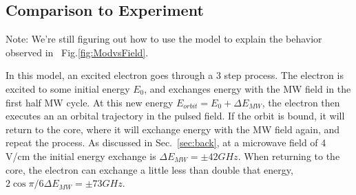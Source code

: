\documentclass[aps,pra,preprint,groupedaddress]{revtex4-1}
\begin{document}

\subsection{\label{sec:ComptoExp} Comparison to Experiment}









Note: We're still figuring out how to use the model to explain the behavior observed in ~Fig.\ref{fig:ModvsField}.

In this model, an excited electron goes through a 3 step process. The electron is excited to some initial energy $E_0$, and exchanges energy with the MW field in the first half MW cycle. At this new energy $E_{orbit} = E_0 + \Delta E_{MW}$, the electron then executes an an orbital trajectory in the pulsed field. If the orbit is bound, it will return to the core, where it will exchange energy with the MW field again, and repeat the process. As discussed in Sec.~\ref{sec:back}, at a microwave field of 4 V/cm the initial energy exchange is $\Delta E_{MW} = \pm 42 GHz$. When returning to the core, the electron can exchange a little less than double that energy, $2 \cos{\pi/6} \Delta E_{MW} = \pm 73 GHz$.
\end{document}

